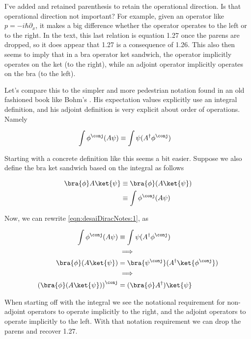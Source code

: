 I've added and retained parenthesis to retain the operational direction.  Is that operational direction not important?  For example, given an operator like $p = -i \hbar \partial_x$, it makes a big difference whether the operator operates to the left or to the right.  In the text, this last relation is equation 1.27 once the parens are dropped, so it does appear that 1.27 is a consequence of 1.26.  This also then seems to imply that in a bra operator ket sandwich, the operator implicitly operates on the ket (to the right), while an adjoint operator implicitly operates on the bra (to the left).

Let's compare this to the simpler and more pedestrian notation found in an old fashioned book like Bohm's \cite{bohm1989qt}.  His expectation values explicitly use an integral definition, and his adjoint definition is very explicit about order of operations.  Namely

\begin{align}\label{eqn:desaiDiracNotes:1}
\int \phi^\conj (A \psi) 
&\equiv \int \psi (A^\dagger \phi^\conj) 
\end{align}

Starting with a concrete definition like this seems a bit easier.  Suppose we also define the bra ket sandwich based on the integral as follows

\begin{align*}
\bra{\phi} A \ket{\psi} 
&\equiv \bra{\phi} (A \ket{\psi}) \\
&\equiv \int \phi^\conj (A \psi) \\
\end{align*}

Now, we can rewrite \ref{eqn:desaiDiracNotes:1}, as 

\begin{align*}
\int \phi^\conj (A \psi)   &\equiv \int \psi (A^\dagger \phi^\conj) \\
&\implies \\
\bra{\phi} (A \ket{\psi})  &= \bra{\psi^\conj} ( A^\dagger \ket{\phi^\conj} ) \\
&\implies \\
\left(\bra{\phi} (A \ket{\psi}) \right)^\conj  &= ( \bra{\phi} A^\dagger ) \ket{\psi}
\end{align*}

When starting off with the integral we see the notational requirement for non-adjoint operators to operate implicitly to the right, and the adjoint operators to operate implicitly to the left.  With that notation requirement we can drop the parens and recover 1.27.

